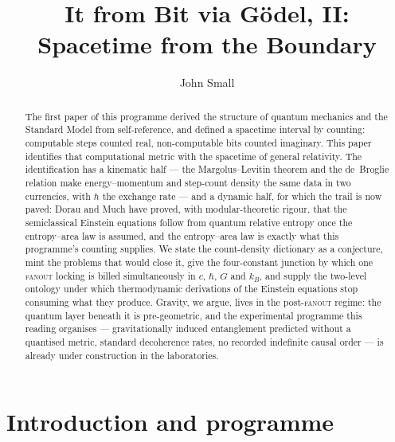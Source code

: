 \documentclass[11pt,a4paper]{article}
\title{It from Bit via G\"odel, II:\\ Spacetime from the \fanout{} Boundary}
\author{John Small}
\date{\docversion}
\newcommand{\fanout}{\textsc{fanout}}
\begin{document}
\maketitle

\begin{abstract}
The first paper of this programme derived the structure of quantum mechanics and the Standard
Model from self-reference, and defined a spacetime interval by counting: computable steps counted
real, non-computable bits counted imaginary. This paper identifies that computational metric with
the spacetime of general relativity. The identification has a kinematic half --- the
Margolus--Levitin theorem and the de~Broglie relation make energy--momentum and step-count density
the same data in two currencies, with $\hbar$ the exchange rate --- and a dynamic half, for which
the trail is now paved: Dorau and Much have proved, with modular-theoretic rigour, that the
semiclassical Einstein equations follow from quantum relative entropy once the entropy--area law
is assumed, and the entropy--area law is exactly what this programme's counting supplies. We state
the count-density dictionary as a conjecture, mint the problems that would close it, give the
four-constant junction by which one \fanout{} locking is billed simultaneously in $c$, $\hbar$,
$G$ and $k_{B}$, and supply the two-level ontology under which thermodynamic derivations of the
Einstein equations stop consuming what they produce. Gravity, we argue, lives in the
post-\fanout{} regime: the quantum layer beneath it is pre-geometric, and the experimental
programme this reading organises --- gravitationally induced entanglement predicted without a
quantised metric, standard decoherence rates, no recorded indefinite causal order --- is already
under construction in the laboratories.
\end{abstract}

\section{Introduction and programme}
\label{sec:p2-intro}

\end{document}
